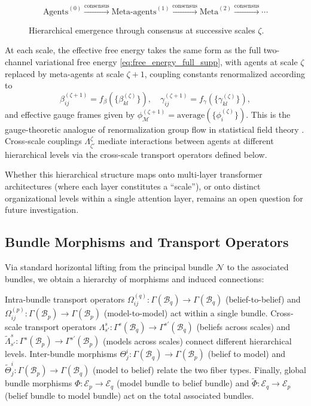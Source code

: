 \documentclass[twoside,11pt]{article}
\begin{document}
\begin{figure}[h]
\centering
\small
\[
\text{Agents}^{(0)} \xrightarrow{\text{consensus}}
\text{Meta-agents}^{(1)} \xrightarrow{\text{consensus}}
\text{Meta}^{(2)} \xrightarrow{\text{consensus}} \cdots
\]
\caption{Hierarchical emergence through consensus at successive scales $\zeta$.}
\label{fig:hierarchy}
\end{figure}

At each scale, the effective free energy takes the same form as the full two-channel variational free energy \eqref{eq:free_energy_full_supp}, with agents at scale $\zeta$ replaced by meta-agents at scale $\zeta+1$, coupling constants renormalized according to
\begin{equation*}
  \beta_{ij}^{(\zeta+1)} = f_\beta(\{\beta_{kl}^{(\zeta)}\}), \quad
  \gamma_{ij}^{(\zeta+1)} = f_\gamma(\{\gamma_{kl}^{(\zeta)}\}),
\end{equation*}
and effective gauge frames given by $\phi_{\mathcal{M}}^{(\zeta+1)} = \text{average}(\{\phi_i^{(\zeta)}\})$.
This is the gauge-theoretic analogue of renormalization group flow in statistical field theory \citep{anderson1984basic,wilson1974renormalization,garciaperez2018multiscale}. Cross-scale couplings $\Lambda^{\zeta}_{\zeta'}$ mediate interactions between agents at different hierarchical levels via the cross-scale transport operators defined below.

Whether this hierarchical structure maps onto multi-layer transformer architectures (where each layer constitutes a ``scale''), or onto distinct organizational levels within a single attention layer, remains an open question for future investigation.

\subsection{Bundle Morphisms and Transport Operators}
Via standard horizontal lifting from the principal bundle $\mathcal{N}$ to the associated bundles, we obtain a hierarchy of morphisms and induced connections:

Intra-bundle transport operators $\Omega^{(q)}_{ij}: \Gamma(\mathcal{B}_q) \to \Gamma(\mathcal{B}_q)$ (belief-to-belief) and $\Omega^{(p)}_{ij}: \Gamma(\mathcal{B}_p) \to \Gamma(\mathcal{B}_p)$ (model-to-model) act within a single bundle. Cross-scale transport operators $\Lambda^{s}_{s'}: \Gamma^{s}(\mathcal{B}_q) \to \Gamma^{s'}(\mathcal{B}_q)$ (beliefs across scales) and $\tilde{\Lambda}^{s}_{s'}: \Gamma^{s}(\mathcal{B}_p) \to \Gamma^{s'}(\mathcal{B}_p)$ (models across scales) connect different hierarchical levels. Inter-bundle morphisms $\Theta^i_j: \Gamma(\mathcal{B}_q) \to \Gamma(\mathcal{B}_p)$ (belief to model) and $\tilde{\Theta}^i_j: \Gamma(\mathcal{B}_p) \to \Gamma(\mathcal{B}_q)$ (model to belief) relate the two fiber types. Finally, global bundle morphisms $\Phi: \mathcal{E}_p \to \mathcal{E}_q$ (model bundle to belief bundle) and $\tilde{\Phi}: \mathcal{E}_q \to \mathcal{E}_p$ (belief bundle to model bundle) act on the total associated bundles.
\end{document}
